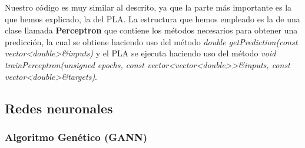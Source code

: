 Nuestro código es muy similar al descrito, ya que la parte más importante es la que hemos explicado, la del PLA. La estructura que hemos empleado es la de una clase llamada \textbf{Perceptron} que contiene los métodos necesarios para obtener una predicción, la cual se obtiene haciendo uso del método \textit{double getPrediction(const vector\textless double\textgreater \&inputs)} y el PLA se ejecuta haciendo uso del método \textit{void trainPerceptron(unsigned epochs, const vector\textless vector\textless double\textgreater \textgreater \&inputs, const vector\textless double\textgreater \&targets)}.

\newpage
\subsection{Redes neuronales}
\label{subsec:nn}


\newpage
\subsubsection{Algoritmo Genético (GANN)}
\label{subsubsec:nn:gann}


\newpage